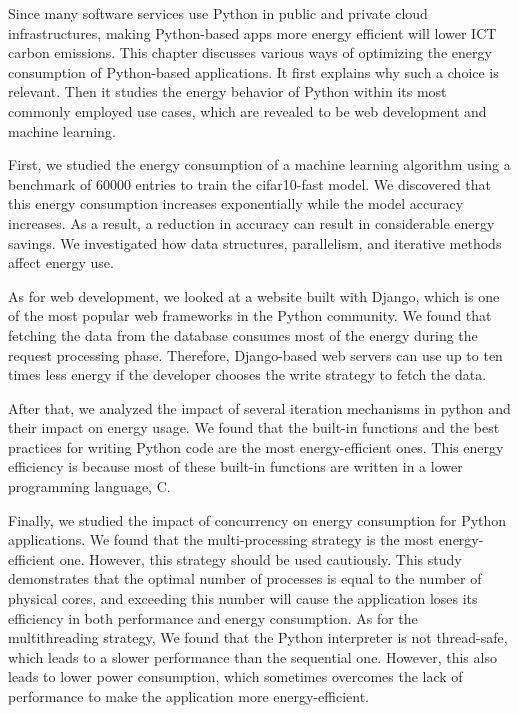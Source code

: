 Since many software services use Python in public and private cloud infrastructures, making Python-based apps more energy efficient will lower ICT carbon emissions.
This chapter discusses various ways of optimizing the energy consumption of Python-based applications. It first explains why such a choice is relevant. Then it studies the energy behavior of Python within its most commonly employed use cases, which are revealed to be web development and machine learning.


First, we studied the energy consumption of a machine learning algorithm using a benchmark of 60000 entries to train the cifar10-fast model. We discovered that this energy consumption increases exponentially while the model accuracy increases.
As a result, a reduction in accuracy can result in considerable energy savings.
We investigated how data structures, parallelism, and iterative methods affect energy use.

As for web development, we looked at a website built with Django, which is one of the most popular web frameworks in the Python community. We found that fetching the data from the database consumes most of the energy during the request processing phase. Therefore, Django-based web servers can use up to ten times less energy if the developer chooses the write strategy to fetch the data.

After that, we analyzed the impact of several iteration mechanisms in python and their impact on energy usage. We found that the built-in functions and the best practices for writing Python code are the most energy-efficient ones. This energy efficiency is because most of these built-in functions are written in a lower programming language, C.


Finally, we studied the impact of concurrency on energy consumption for Python applications. We found that the multi-processing strategy is the most energy-efficient one. However, this strategy should be used cautiously. This study demonstrates that the optimal number of processes is equal to the number of physical cores, and exceeding this number will cause the application loses its efficiency in both performance and energy consumption. As for the multithreading strategy, We found that the Python interpreter is not thread-safe, which leads to a slower performance than the sequential one. However, this also leads to lower power consumption, which sometimes overcomes the lack of performance to make the application more energy-efficient.

